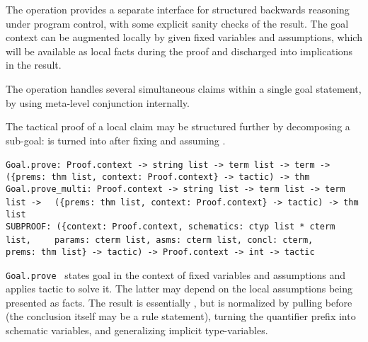 \begin{isabellebody}
\begin{isamarkuptext}
  \medskip The  operation provides a separate interface
  for structured backwards reasoning under program control, with some
  explicit sanity checks of the result.  The goal context can be
  augmented locally by given fixed variables and assumptions, which
  will be available as local facts during the proof and discharged
  into implications in the result.

  The  operation handles several simultaneous
  claims within a single goal statement, by using meta-level
  conjunction internally.

  \medskip The tactical proof of a local claim may be structured
  further by decomposing a sub-goal: 
  is turned into  after fixing  and
  assuming .%
\end{isamarkuptext}%
\isamarkuptrue%
%
\isadelimmlref
%
\endisadelimmlref
%
\isatagmlref
%
\begin{isamarkuptext}%
\begin{mldecls}
  \verb|Goal.prove: Proof.context -> string list -> term list -> term ->|\isasep\isanewline%
\verb|  ({prems: thm list, context: Proof.context} -> tactic) -> thm| \\
  \verb|Goal.prove_multi: Proof.context -> string list -> term list -> term list ->|\isasep\isanewline%
\verb|  ({prems: thm list, context: Proof.context} -> tactic) -> thm list| \\
  \verb|SUBPROOF: ({context: Proof.context, schematics: ctyp list * cterm list,|\isasep\isanewline%
\verb|    params: cterm list, asms: cterm list, concl: cterm,|\isasep\isanewline%
\verb|    prems: thm list} -> tactic) -> Proof.context -> int -> tactic|
  \end{mldecls}

  \begin{description}

  \item \verb|Goal.prove|~ states goal  in the context of fixed variables  and assumptions
   and applies tactic  to solve it.  The
  latter may depend on the local assumptions being presented as facts.
  The result is essentially , but is normalized
  by pulling \isa{{\isasymAnd}} before \isa{{\isasymLongrightarrow}} (the conclusion  itself may be a rule statement), turning the quantifier prefix
  into schematic variables, and generalizing implicit type-variables.


\end{description}
\end{isamarkuptext}
\end{isabellebody}
